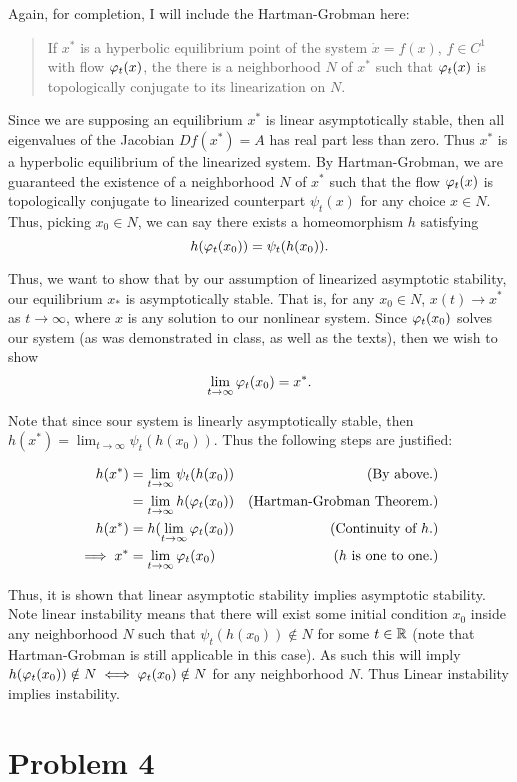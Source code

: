 \begin{solution}
    
    Again, for completion, I will include the Hartman-Grobman here:

    \alignbreak
    \vspace{-8mm}
    \begin{quote}
        If $x^*$ is a hyperbolic equilibrium point of the system $\dot{x} = f(x)$, $f \in C^1$ with flow $\varphi_t(x)$, the there is a neighborhood $N$ of $x^*$ such that $\varphi_t(x)$ is topologically conjugate to its linearization on $N$.
    \end{quote}
    \vspace{-8mm}
    \alignbreak

    Since we are supposing an equilibrium $x^*$ is linear asymptotically stable, then all eigenvalues of the Jacobian $Df(x^*) = A$ has real part less than zero. Thus $x^*$ is a hyperbolic equilibrium of the linearized system. By Hartman-Grobman, we are guaranteed the existence of a neighborhood $N$ of $x^*$ such that the flow $\varphi_t(x)$ is topologically conjugate to linearized counterpart $\psi_t(x)$ for any choice $x \in N$. Thus, picking $x_0 \in N$, we can say there exists a homeomorphism $h$ satisfying
    \[
    h(\varphi_t(x_0)) = \psi_t(h(x_0)).
    \]

    Thus, we want to show that by our assumption of linearized asymptotic stability, our equilibrium $x_*$ is asymptotically stable. That is, for any $x_0 \in N$, $x(t) \rightarrow x^*$ as $t \rightarrow \infty$, where $x$ is any solution to our nonlinear system. Since $\varphi_t(x_0)$ solves our system (as was demonstrated in class, as well as the texts), then we wish to show 
    \[
    \lim_{t \rightarrow \infty} \varphi_t(x_0) = x^*.
    \]
    
    Note that since sour system is linearly asymptotically stable, then $h(x^*) = \lim_{t\rightarrow \infty} \psi_t(h(x_0))$. Thus the following steps are justified:

    \alignbreak
    \begin{align}
        h(x^*) &= \lim_{t \rightarrow \infty} \psi_t(h(x_0)) &\text{(By above.)}\nonumber\\
        &= \lim_{t \rightarrow \infty} h(\varphi_t(x_0)) &\text{(Hartman-Grobman Theorem.)}\nonumber\\
        h(x^*) &= h(\lim_{t \rightarrow \infty} \varphi_t(x_0)) &\text{(Continuity of $h$.)}\nonumber\\
        \implies x^* &= \lim_{t \rightarrow \infty} \varphi_t(x_0) &\text{($h$ is one to one.)}\nonumber
    \end{align}
    \alignbreak

    \newpage
    Thus, it is shown that linear asymptotic stability implies asymptotic stability. Note linear instability means that there will exist some initial condition $x_0$ inside any neighborhood $N$ such that $\psi_t(h(x_0)) \notin N$ for some $t \in \mathbb{R}$ (note that Hartman-Grobman is still applicable in this case). As such this will imply $h(\varphi_t(x_0)) \notin N \iff \varphi_t(x_0) \notin N$ for any neighborhood $N$. Thus Linear instability implies instability.   
\end{solution}

\newpage
\section{Problem 4}


